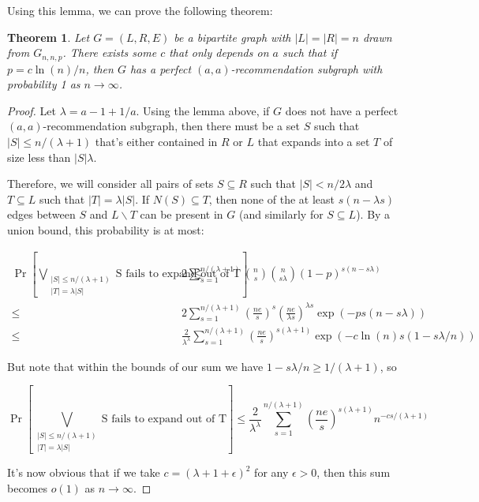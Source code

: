 \documentclass[11pt]{article}
\newtheorem{thm}{Theorem}
\begin{document}
Using this lemma, we can prove the following theorem:

\begin{thm} 
Let $G=(L,R,E)$ be a bipartite graph with $|L|=|R|=n$ drawn from $G_{n,n,p}$. There exists some $c$ that only depends on $a$ such that if $p=c\ln(n)/n$, then $G$ has a perfect $(a,a)$-recommendation subgraph with probability 1 as $n\to\infty$.
\end{thm}

\begin{proof}
Let $\lambda = a - 1 + 1/a$. Using the lemma above, if $G$ does not have a perfect $(a,a)$-recommendation subgraph, then there must be a set $S$ such that $|S|\leq n/(\lambda+1)$ that's either contained in $R$ or $L$ that expands into a set $T$ of size less than $|S|\lambda$.

Therefore, we will consider all pairs of sets $S\subseteq R$ such that $|S|<n/2\lambda$ and $T\subseteq L$ such that $|T| = \lambda|S|$. If $N(S)\subseteq T$, then none of the at least $s(n-\lambda s)$ edges between $S$ and $L\backslash T$ can be present in $G$ (and similarly for $S\subseteq L$). By a union bound, this probability is at most: 

\begin{align*}
       \Pr\left[\bigvee_{\substack{|S|\leq n/(\lambda+1) \\ |T| = \lambda |S|}} \text{S fails to expand out of T}\right]
\leq&  2\sum_{s=1}^{n/(\lambda+1)} \binom{n}{s}\binom{n}{s\lambda}(1-p)^{s(n-s\lambda)} \\
\leq&  2\sum_{s=1}^{n/(\lambda+1)} \left(\frac{ne}{s}\right)^s \left(\frac{ne}{\lambda s}\right)^{\lambda s} \exp\left(-ps(n-s\lambda)\right) \\
\leq&  \frac{2}{\lambda^\lambda} \sum_{s=1}^{n/(\lambda+1)} \left(\frac{ne}{s}\right)^{s(\lambda+1)} \exp\left(-c\ln(n)s(1-s\lambda/n)\right)
\end{align*}

But note that within the bounds of our sum we have $1-s\lambda/n \geq 1/(\lambda+1)$, so

\[
\Pr\left[\bigvee_{\substack{|S|\leq n/(\lambda+1) \\ |T| = \lambda |S|}} \text{S fails to expand out of T}\right]
\leq \frac{2}{\lambda^\lambda} \sum_{s=1}^{n/(\lambda+1)} \left(\frac{ne}{s}\right)^{s(\lambda+1)} n^{-cs/(\lambda+1)}
\]

It's now obvious that if we take $c=(\lambda+1+\epsilon)^2$ for any $\epsilon>0$, then this sum becomes $o(1)$ as $n\to\infty$. 
\end{proof}
\end{document}
